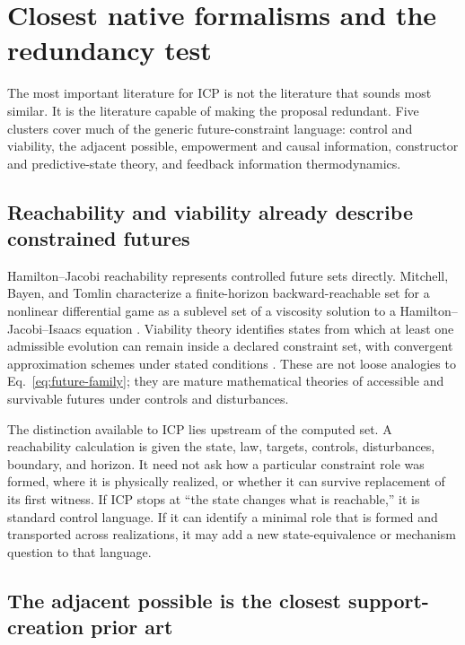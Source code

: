\section{Closest native formalisms and the redundancy test}

The most important literature for ICP is not the literature that sounds most
similar. It is the literature capable of making the proposal redundant. Five
clusters cover much of the generic future-constraint language: control and
viability, the adjacent possible, empowerment and causal information,
constructor and predictive-state theory, and feedback information
thermodynamics.

\subsection{Reachability and viability already describe constrained futures}

Hamilton--Jacobi reachability represents controlled future sets directly.
Mitchell, Bayen, and Tomlin characterize a finite-horizon backward-reachable set
for a nonlinear differential game as a sublevel set of a viscosity solution to
a Hamilton--Jacobi--Isaacs equation \citep{MitchellEtAl2005Reachable}. Viability
theory identifies states from which at least one admissible evolution can remain
inside a declared constraint set, with convergent approximation schemes under
stated conditions \citep{SaintPierre1994Viability}. These are not loose
analogies to Eq.~\eqref{eq:future-family}; they are mature mathematical theories
of accessible and survivable futures under controls and disturbances.

The distinction available to ICP lies upstream of the computed set. A
reachability calculation is given the state, law, targets, controls,
disturbances, boundary, and horizon. It need not ask how a particular
constraint role was formed, where it is physically realized, or whether it can
survive replacement of its first witness. If ICP stops at ``the state changes
what is reachable,'' it is standard control language. If it can identify a
minimal role that is formed and transported across realizations, it may add a
new state-equivalence or mechanism question to that language.

\subsection{The adjacent possible is the closest support-creation prior art}


